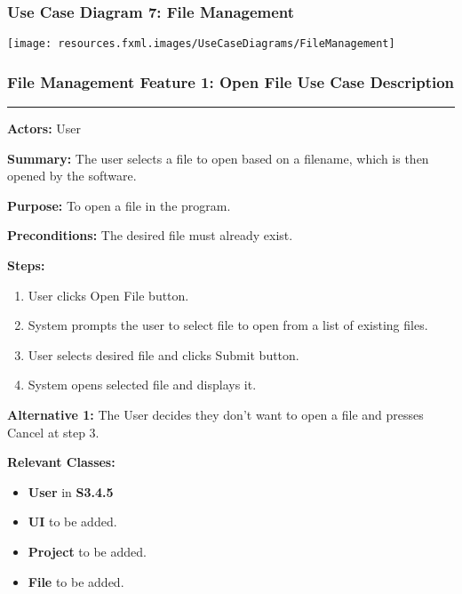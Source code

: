 \documentclass[twoside,letterpaper]{article}
\begin{document}
\newpage


\subsubsection[Use Case Diagram 7: File Management]{\rmfamily\bfseries\color{black}
	Use Case Diagram 7: File Management}
\hypertarget{RefHeading22059017292}{}

\texttt{[image: resources.fxml.images/UseCaseDiagrams/FileManagement]}

\newpage

\subsubsection[File Management Feature 1: Open File Use Case Description]{\rmfamily\bfseries\color{black}
	File Management Feature 1: Open File Use Case Description}
\hypertarget{RefHeading22059017292}{}

\vspace{2pt}
\hrule
\vspace{8pt}
\textbf{Actors:} User \newline

\noindent\textbf{Summary:} The user selects a file to open based on a filename, which is then opened by the software. \newline

\noindent\textbf{Purpose:} To open a file in the program. \newline

\noindent\textbf{Preconditions:} The desired file must already exist. \newline

\noindent\textbf{Steps:}
\begin{enumerate}
	\item User clicks Open File button.
	\item System prompts the user to select file to open from a list of existing files.
	\item User selects desired file and clicks Submit button.
	\item System opens selected file and displays it.
\end{enumerate}
\noindent\textbf{Alternative 1:} The User decides they don't want to open a file and presses Cancel at step 3. \newline

\noindent\textbf{Relevant Classes:}
\begin{itemize}
	\item \textbf{User} in \textbf{S3.4.5}
	\item \textbf{UI} to be added.
	\item \textbf{Project} to be added.
	\item \textbf{File} to be added.
\end{itemize}
\end{document}
